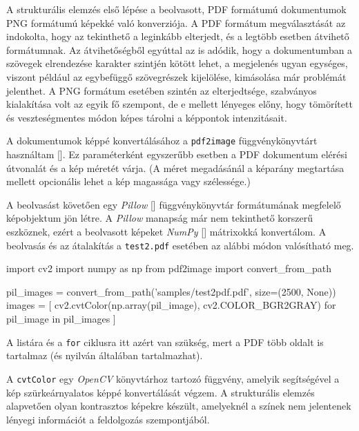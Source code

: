 
A strukturális elemzés első lépése a beolvasott, PDF formátumú dokumentumok PNG formátumú képekké való konverziója.
A PDF formátum megválasztását az indokolta, hogy az tekinthető a leginkább elterjedt, és a legtöbb esetben átvihető formátumnak.
Az átvihetőségből egyúttal az is adódik, hogy a dokumentumban a szövegek elrendezése karakter szintjén kötött lehet, a megjelenés ugyan egységes, viszont például az egybefüggő szövegrészek kijelölése, kimásolása már problémát jelenthet.
A PNG formátum esetében szintén az elterjedtsége, szabványos kialakítása volt az egyik fő szempont, de e mellett lényeges előny, hogy tömörített és veszteségmentes módon képes tárolni a képpontok intenzitásait.


A dokumentumok képpé konvertálásához a \texttt{pdf2image} függvénykönyvtárt használtam [].
Ez paraméterként egyszerűbb esetben a PDF dokumentum elérési útvonalát és a kép méretét várja.
(A méret megadásánál a képarány megtartása mellett opcionális lehet a kép magassága vagy szélessége.)

A beolvasást követően egy \textit{Pillow} [] függvénykönyvtár formátumának megfelelő képobjektum jön létre.
A \textit{Pillow} manapság már nem tekinthető korszerű eszköznek, ezért a beolvasott képeket \textit{NumPy} [] mátrixokká konvertálom.
A beolvasás és az átalakítás a \texttt{test2.pdf} esetében az alábbi módon valósítható meg.

\begin{python}
import cv2
import numpy as np
from pdf2image import convert_from_path

pil_images = convert_from_path('samples/test2pdf.pdf', size=(2500, None))
images = [
    cv2.cvtColor(np.array(pil_image), cv2.COLOR_BGR2GRAY)
    for pil_image in pil_images
]
\end{python}

A listára és a \texttt{for} ciklusra itt azért van szükség, mert a PDF több oldalt is tartalmaz (és nyilván általában tartalmazhat).

A \texttt{cvtColor} egy \textit{OpenCV} könyvtárhoz tartozó függvény, amelyik segítségével a kép szürkeárnyalatos képpé konvertálását végzem.
A strukturális elemzés alapvetően olyan kontrasztos képekre készült, amelyeknél a színek nem jelentenek lényegi információt a feldolgozás szempontjából.

